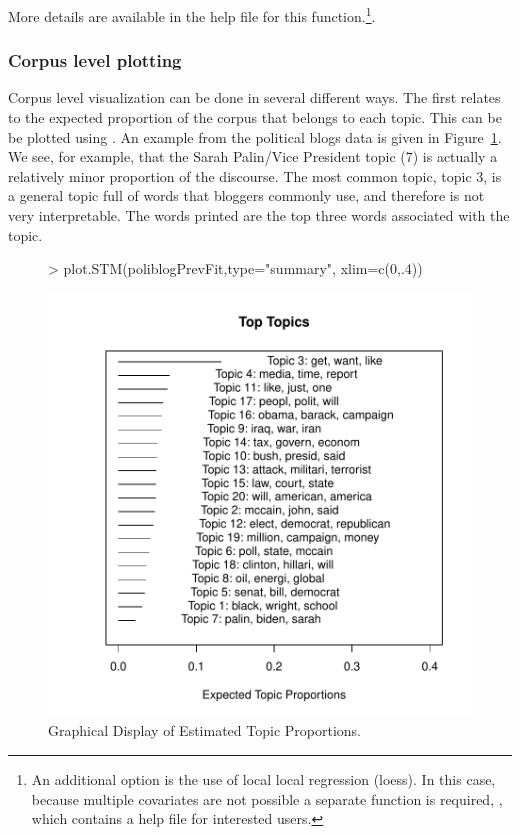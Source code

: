 \documentclass[nojss]{jss}
\begin{document}
More details are available in the help file for this function.\footnote{An additional option is the use of local local regression (loess). In this case, because multiple covariates are not possible a separate function is required, , which contains a help file for interested users.}.


\subsubsection{Corpus level plotting}

Corpus level visualization can be done in several different ways. The first relates to the expected proportion of the corpus that belongs to each topic. This can be be plotted using . An example from the political blogs data is given in Figure~\ref{fig:summary}. We see, for example, that the Sarah Palin/Vice President topic (7) is actually a relatively minor proportion of the discourse.  The most common topic, topic 3, is a general topic full of words that bloggers commonly use, and therefore is not very interpretable. The words printed are the top three words associated with the topic.

\begin{figure}[t!]
\begin{center}
\begin{Schunk}
\begin{Sinput}
> plot.STM(poliblogPrevFit,type="summary", xlim=c(0,.4))
\end{Sinput}
\end{Schunk}
\includegraphics{stmVignette-020}
\caption{Graphical Display of Estimated Topic Proportions.}
\label{fig:summary}
\end{center}
\end{figure}
\end{document}
